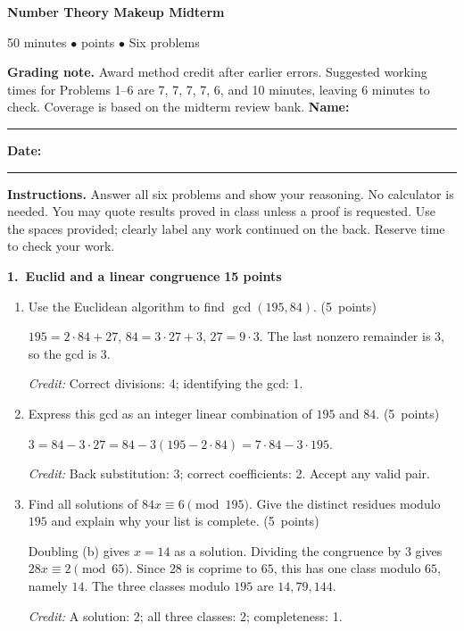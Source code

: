 \documentclass[11pt,letterpaper]{article}
\newcommand{\partpts}[1]{\unskip\nobreak\hspace{.3em}%
  \mbox{\small\color{muted}(#1 points)}}
\newcommand{\credit}[1]{\par{\footnotesize\color{muted}\textit{Credit:} #1}}
\newcommand{\problem}[3]{\par\addvspace{9pt}%
  {\large\bfseries\color{indigo}#1.\ #2}\hfill
  {\small\color{muted}\textbf{#3 points}}\par\nobreak}
\begin{document}
{\LARGE\bfseries\color{indigo}Number Theory Makeup Midterm}\par
{\small\color{muted}50 minutes \quad $\bullet$  points
  \quad $\bullet$ \quad Six problems}\par
\ifanswers
\textbf{Grading note.} Award method credit after earlier errors. Suggested
working times for Problems 1--6 are 7, 7, 7, 7, 6, and 10 minutes,
leaving 6 minutes to check. Coverage is based on the midterm review bank.
\else
\smallskip
\textbf{Name:}\ \rule{.49\linewidth}{.4pt}\hfill
\textbf{Date:}\ \rule{.20\linewidth}{.4pt}\par
\fi
\textbf{Instructions.} Answer all six problems and show your reasoning.
No calculator is needed. You may quote results proved in class unless a
proof is requested. Use the spaces provided; clearly label any work
continued on the back. Reserve time to check your work.

\problem{1}{Euclid and a linear congruence}{15}
\begin{enumerate}
\item Use the Euclidean algorithm to find $\gcd(195,84)$. \partpts{5}
\begin{solution}[.7in]
$195=2\cdot84+27$, $84=3\cdot27+3$, $27=9\cdot3$.
The last nonzero remainder is $3$, so the gcd is $3$.
\credit{Correct divisions: 4; identifying the gcd: 1.}
\end{solution}
\item Express this gcd as an integer linear combination of $195$ and $84$.
\partpts{5}
\begin{solution}[.65in]
$3=84-3\cdot27=84-3(195-2\cdot84)=7\cdot84-3\cdot195$.
\credit{Back substitution: 3; correct coefficients: 2. Accept any valid pair.}
\end{solution}
\item Find all solutions of $84x\equiv6\pmod{195}$. Give the distinct
residues modulo $195$ and explain why your list is complete. \partpts{5}
\begin{solution}[.8in]
Doubling (b) gives $x=14$ as a solution. Dividing the congruence by $3$
gives $28x\equiv2\pmod{65}$. Since $28$ is coprime to $65$, this has one
class modulo $65$, namely $14$. The three classes modulo $195$ are
$14,79,144$.
\credit{A solution: 2; all three classes: 2; completeness: 1.}
\end{solution}
\end{enumerate}
\end{document}
